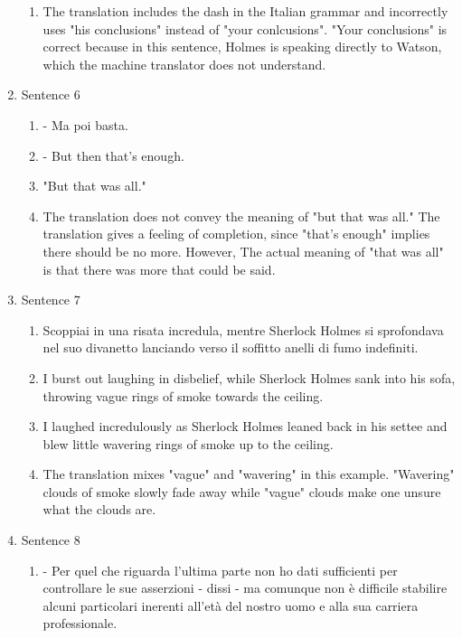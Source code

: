 \documentclass{article}
\begin{document}
\begin{enumerate}
\begin{enumerate}[label=(\alph*)]
        \item The translation includes the dash in the Italian grammar and incorrectly uses "his conclusions"
            instead of "your conlcusions". "Your conclusions" is correct because in this sentence, Holmes is 
            speaking directly to Watson, which the machine translator does not understand.
    \end{enumerate}   
    \item Sentence 6
    \begin{enumerate}[label=(\alph*)]
        \item     - Ma poi basta.
        \item  - But then that's enough.
        \item  "But that was all."
        \item The translation does not convey the meaning of "but that was all." The translation
        gives a feeling of completion, since "that's enough" implies there should be no more. However,
        The actual meaning of "that was all" is that there was more that could be said.
    \end{enumerate}   
    \item Sentence 7
    \begin{enumerate}[label=(\alph*)]
        \item   Scoppiai in una risata incredula, mentre Sherlock Holmes si sprofondava nel suo divanetto lanciando verso il soffitto anelli di fumo indefiniti.
        \item I burst out laughing in disbelief, while Sherlock Holmes sank into his sofa, throwing vague rings of smoke towards the ceiling. 
        \item I laughed incredulously as Sherlock Holmes leaned back in his settee and blew little wavering rings of smoke up to the ceiling.
        \item The translation mixes "vague" and "wavering" in this example. "Wavering" clouds of smoke slowly fade away while 
            "vague" clouds make one unsure what the clouds are.
    \end{enumerate}   
    \item Sentence 8
    \begin{enumerate}[label=(\alph*)]
        \item   - Per quel che riguarda l'ultima parte non ho dati sufficienti per controllare le sue asserzioni - dissi - ma comunque non è difficile stabilire alcuni particolari inerenti all'età del nostro uomo e alla sua carriera professionale.

\end{enumerate}
\end{enumerate}
\end{document}
